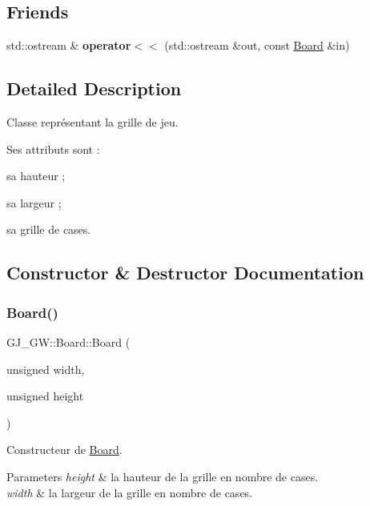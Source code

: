 \subsection*{Friends}
\begin{DoxyCompactItemize}
\item 
\hypertarget{class_g_j___g_w_1_1_board_a43ea56eff2b5462c9ce89356c1a2a7c3}{}\label{class_g_j___g_w_1_1_board_a43ea56eff2b5462c9ce89356c1a2a7c3} 
std\+::ostream \& {\bfseries operator$<$$<$} (std\+::ostream \&out, const \hyperlink{class_g_j___g_w_1_1_board}{Board} \&in)
\end{DoxyCompactItemize}


\subsection{Detailed Description}
Classe représentant la grille de jeu. 

Ses attributs sont \+:


\begin{DoxyItemize}
\item sa hauteur ;
\item sa largeur ;
\item sa grille de cases. 
\end{DoxyItemize}

\subsection{Constructor \& Destructor Documentation}
\hypertarget{class_g_j___g_w_1_1_board_a8029a10441779488fdace01047b27dcd}{}\label{class_g_j___g_w_1_1_board_a8029a10441779488fdace01047b27dcd} 
\subsubsection{\texorpdfstring{Board()}{Board()}}
{\footnotesize\ttfamily G\+J\+\_\+\+G\+W\+::\+Board\+::\+Board (\begin{DoxyParamCaption}\item[{unsigned}]{width,  }\item[{unsigned}]{height }\end{DoxyParamCaption})}



Constructeur de \hyperlink{class_g_j___g_w_1_1_board}{Board}. 


\begin{DoxyParams}{Parameters}
{\em height} & la hauteur de la grille en nombre de cases. \\
\hline
{\em width} & la largeur de la grille en nombre de cases. \\
\hline
\end{DoxyParams}



